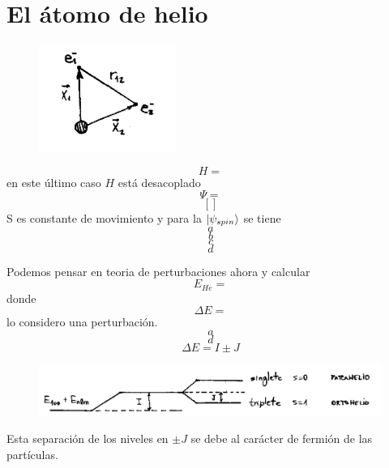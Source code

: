 \documentclass[10pt,oneside]{CBFT_book}
\begin{document}
\section{El átomo de helio}


\begin{figure}[htb]
	\begin{center}
	\includegraphics[width=0.4\textwidth]{images/teo2_30.pdf}
	\end{center}
	\caption{}
\end{figure} 
\[
	H = 
\]
en este último caso $H$ está desacoplado 
\[
	\Psi = 
\]
\[
	[]
\]
S es constante de movimiento y para la $\Ket{\psi_{spin}}$ se tiene 
\[
	a
\]
\[
	b
\]
\[
	c
\]
\[
	d
\]

Podemos pensar en teoria de perturbaciones ahora y calcular 
\[
	E_{He} = 
\]
donde 
\[
	\Delta E = 
\]
lo considero una perturbación.
\[
	a
\]
\[
	d
\]
\[
	\Delta E = I \pm J
\]

\begin{figure}[htb]
	\begin{center}
	\includegraphics[width=1.0\textwidth]{images/teo2_15.pdf}
	\end{center}
	\caption{}
\end{figure} 

Esta separación de los niveles en $\pm J$ se debe al carácter de fermión de las partículas.



\end{document}
